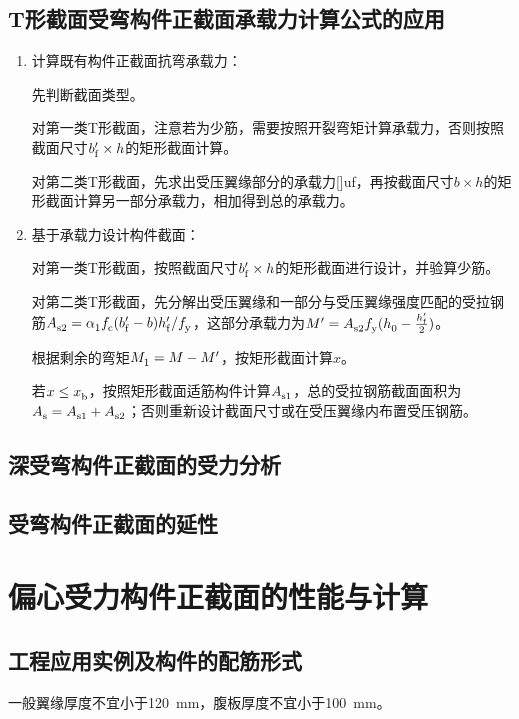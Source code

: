 \documentclass{article}
\begin{document}
\subsection{T形截面受弯构件正截面承载力计算公式的应用}
\begin{enumerate}
      \item 计算既有构件正截面抗弯承载力：
            \par 先判断截面类型。
            \par 对第一类T形截面，注意若为少筋，需要按照开裂弯矩计算承载力，否则按照截面尺寸$\script{b}[\prime]{f}\times{}h$的矩形截面计算。
            \par 对第二类T形截面，先求出受压翼缘部分的承载力[\prime]{uf}，再按截面尺寸$b\times{}h$的矩形截面计算另一部分承载力，相加得到总的承载力。
      \item 基于承载力设计构件截面：
            \par 对第一类T形截面，按照截面尺寸$\script{b}[\prime]{f}\times{}h$的矩形截面进行设计，并验算少筋。
            \par 对第二类T形截面，先分解出受压翼缘和一部分与受压翼缘强度匹配的受拉钢筋$\script{A}{s2}=\script{\alpha}{1}\script{f}{c}(\script{b}[\prime]{f}-b)\script{h}[\prime]{f}/\script{f}{y}$，这部分承载力为$\script{M}[\prime]{}=\script{A}{s2}\script{f}{y}(\script{h}{0}-\frac{\script{h}[\prime]{f}}{2})$。
            \par 根据剩余的弯矩$\script{M}{1}=M-\script{M}[\prime]{}$，按矩形截面计算$x$。
            \par 若$x\le\script{x}{b}$，按照矩形截面适筋构件计算$\script{A}{s1}$，总的受拉钢筋截面面积为$\script{A}{s}=\script{A}{s1}+\script{A}{s2}$；否则重新设计截面尺寸或在受压翼缘内布置受压钢筋。
\end{enumerate}
\subsection{深受弯构件正截面的受力分析}
\subsection{受弯构件正截面的延性}
\section{偏心受力构件正截面的性能与计算}
\subsection{工程应用实例及构件的配筋形式}
\par 一般翼缘厚度不宜小于\SI{120}{mm}，腹板厚度不宜小于\SI{100}{mm}。
\end{document}
